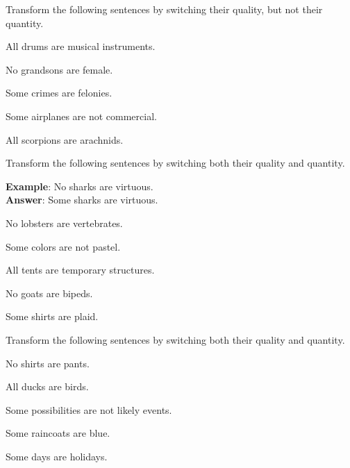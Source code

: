 \noindent\problempart Transform the following sentences by switching their quality, but not their quantity.

\begin{exercises}
\item All drums are musical instruments. 
\item No grandsons are female. 
\item Some crimes are felonies.
\item Some airplanes are not commercial. 
\item All scorpions are arachnids. 
\end{exercises}

\noindent\problempart Transform the following sentences by switching both their quality and quantity.

\textbf{Example}: No sharks are virtuous. \\
\textbf{Answer}: Some sharks are virtuous. 

\begin{exercises}
\item No lobsters are vertebrates. 

\item Some colors are not pastel. 

\item All tents are temporary structures.

\item No goats are bipeds. 
 
\item Some shirts are plaid.
\end{exercises}

\noindent\problempart Transform the following sentences by switching both their quality and quantity.

\begin{exercises}
\item No shirts are pants. 
\item All ducks are birds.  
\item Some possibilities are not likely events.
\item Some raincoats are blue. 
\item Some days are holidays. 
\end{exercises}


